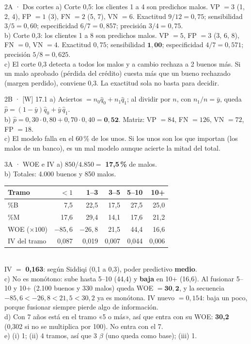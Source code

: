 \documentclass[11pt]{article}
\begin{document}
\begin{pauta}{2A · Dos cortes}
a) Corte 0,5: los clientes 1 a 4 son predichos malos. VP $=3$ (1, 2, 4), FP $=1$ (3), FN $=2$ (5, 7), VN $=6$. Exactitud $9/12=0{,}75$; sensibilidad $3/5=0{,}60$; especificidad $6/7=0{,}857$; precisión $3/4=0{,}75$.\\
b) Corte 0,3: los clientes 1 a 8 son predichos malos. VP $=5$, FP $=3$ (3, 6, 8), FN $=0$, VN $=4$. Exactitud $0{,}75$; sensibilidad $\mathbf{1{,}00}$; especificidad $4/7=0{,}571$; precisión $5/8=0{,}625$.\\
c) El corte 0,3 detecta a todos los malos y a cambio rechaza a 2 buenos más. Si un malo aprobado (pérdida del crédito) cuesta más que un bueno rechazado (margen perdido), conviene 0,3. La exactitud sola no basta para decidir.
\end{pauta}

\begin{pauta}{2B · [W] 17.1}
a) Aciertos $=n_0\hat q_0+n_1\hat q_1$; al dividir por $n$, con $n_1/n=\bar y$, queda $\hat p=(1-\bar y)\hat q_0+\bar y\,\hat q_1$.\\
b) $\hat p=0{,}30\cdot0{,}80+0{,}70\cdot0{,}40=\mathbf{0{,}52}$. Matriz: VP $=84$, FN $=126$, VN $=72$, FP $=18$.\\
c) El modelo falla en el 60\,\% de los unos. Si los unos son los que importan (los malos de un banco), es un mal modelo aunque acierte la mitad del total.
\end{pauta}

\begin{pauta}{3A · WOE e IV}
a) $850/4.850=$ \textbf{17,5\,\%} de malos.\\
b) Totales: 4.000 buenos y 850 malos.\\[2pt]
{\small\begin{tabular}{lrrrrr}\toprule
Tramo & $<1$ & 1--3 & 3--5 & 5--10 & 10+\\\midrule
\%B & 7,5 & 22,5 & 17,5 & 27,5 & 25,0\\
\%M & 17,6 & 29,4 & 14,1 & 17,6 & 21,2\\
WOE ($\times100$) & $-85{,}6$ & $-26{,}8$ & 21,5 & 44,4 & 16,6\\
IV del tramo & 0,087 & 0,019 & 0,007 & 0,044 & 0,006\\\bottomrule
\end{tabular}}\\[2pt]
IV $=$ \textbf{0,163}: según Siddiqi (0,1 a 0,3), poder predictivo \textbf{medio}.\\
c) No es monótono: sube hasta 5--10 (44,4) y \textbf{baja} en 10+ (16,6). Al fusionar 5--10 y 10+ (2.100 buenos y 330 malos) queda WOE $=\mathbf{30{,}2}$, y la secuencia $-85{,}6<-26{,}8<21{,}5<30{,}2$ ya es monótona. IV nuevo $=0{,}154$: baja un poco, porque fusionar siempre pierde algo de información.\\
d) Con 7 años está en el tramo «5 o más», así que entra con su WOE: \textbf{30,2} (0,302 si no se multiplica por 100). No entra con el 7.\\
e) (i) 1; (ii) 4 tramos, así que 3 $\beta$ (uno queda como base); (iii) 1.
\end{pauta}
\end{document}
